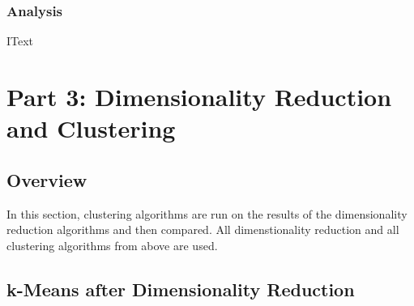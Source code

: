 \documentclass[h]{article}
\begin{document}
\subsubsection*{Analysis}
IText




\section*{Part 3: Dimensionality Reduction and Clustering}
\subsection*{Overview}
In this section, clustering algorithms are run on the results of the 
dimensionality reduction algorithms and then compared.  All dimenstionality 
reduction and all clustering algorithms from above are used.

\subsection*{k-Means after Dimensionality Reduction}
\end{document}
